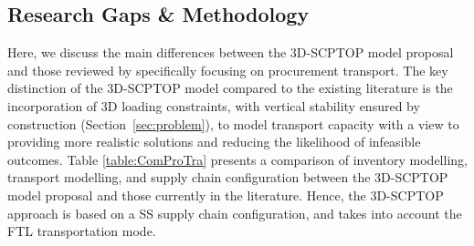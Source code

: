 \subsection{Research Gaps \& Methodology}


Here, we discuss the main differences between the 3D-SCPTOP model proposal and those reviewed by specifically focusing on procurement transport. The key distinction of the 3D-SCPTOP model compared to the existing literature is the incorporation of 3D loading constraints, with vertical stability ensured by construction (Section~\ref{sec:problem}), to model transport capacity with a view to providing more realistic solutions and reducing the likelihood of infeasible outcomes.   Table \ref{table:ComProTra}  presents a comparison of inventory modelling, transport modelling, and supply chain configuration between the 3D-SCPTOP model proposal and those currently in the literature.
Hence,  the 3D-SCPTOP approach is based on a SS supply chain configuration, and takes into account the FTL transportation mode.
